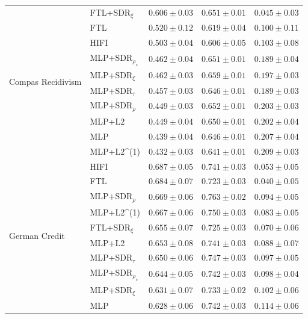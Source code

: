 \begin{tabular}{lllll}
\cline{1-5}
\multirow[t]{10}{*}{Compas Recidivism} & FTL+SDR$_{\xi}$ & $0.606 \pm0.03$ & $0.651 \pm0.01$ & $0.045 \pm0.03$ \\
 & FTL & $0.520 \pm0.12$ & $0.619 \pm0.04$ & $0.100 \pm0.11$ \\
 & HIFI & $0.503 \pm0.04$ & $0.606 \pm0.05$ & $0.103 \pm0.08$ \\
 & MLP+SDR$_{\rho_s}$ & $0.462 \pm0.04$ & $0.651 \pm0.01$ & $0.189 \pm0.04$ \\
 & MLP+SDR$_{\xi}$ & $0.462 \pm0.03$ & $0.659 \pm0.01$ & $0.197 \pm0.03$ \\
 & MLP+SDR$_{\tau}$ & $0.457 \pm0.03$ & $0.646 \pm0.01$ & $0.189 \pm0.03$ \\
 & MLP+SDR$_{\rho}$ & $0.449 \pm0.03$ & $0.652 \pm0.01$ & $0.203 \pm0.03$ \\
 & MLP+L2 & $0.449 \pm0.04$ & $0.650 \pm0.01$ & $0.202 \pm0.04$ \\
 & MLP & $0.439 \pm0.04$ & $0.646 \pm0.01$ & $0.207 \pm0.04$ \\
 & MLP+L2^{(1)} & $0.432 \pm0.03$ & $0.641 \pm0.01$ & $0.209 \pm0.03$ \\
\cline{1-5}
\multirow[t]{10}{*}{German Credit} & HIFI & $0.687 \pm0.05$ & $0.741 \pm0.03$ & $0.053 \pm0.05$ \\
 & FTL & $0.684 \pm0.07$ & $0.723 \pm0.03$ & $0.040 \pm0.05$ \\
 & MLP+SDR$_{\rho}$ & $0.669 \pm0.06$ & $0.763 \pm0.02$ & $0.094 \pm0.05$ \\
 & MLP+L2^{(1)} & $0.667 \pm0.06$ & $0.750 \pm0.03$ & $0.083 \pm0.05$ \\
 & FTL+SDR$_{\xi}$ & $0.655 \pm0.07$ & $0.725 \pm0.03$ & $0.070 \pm0.06$ \\
 & MLP+L2 & $0.653 \pm0.08$ & $0.741 \pm0.03$ & $0.088 \pm0.07$ \\
 & MLP+SDR$_{\tau}$ & $0.650 \pm0.06$ & $0.747 \pm0.03$ & $0.097 \pm0.05$ \\
 & MLP+SDR$_{\rho_s}$ & $0.644 \pm0.05$ & $0.742 \pm0.03$ & $0.098 \pm0.04$ \\
 & MLP+SDR$_{\xi}$ & $0.631 \pm0.07$ & $0.733 \pm0.02$ & $0.102 \pm0.06$ \\
 & MLP & $0.628 \pm0.06$ & $0.742 \pm0.03$ & $0.114 \pm0.06$ \\
\cline{1-5}
\bottomrule
\end{tabular}
